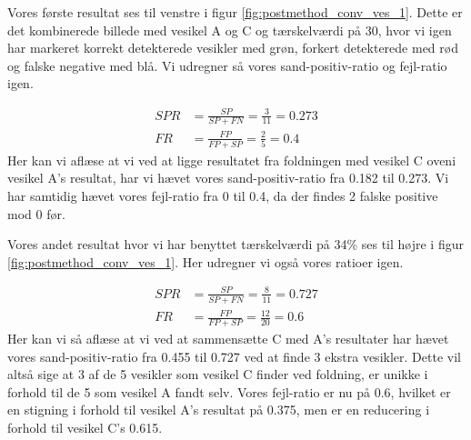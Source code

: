 Vores første resultat ses til venstre i figur \ref{fig:postmethod_conv_ves_1}. Dette er det kombinerede billede med vesikel A og C og tærskelværdi på 30, hvor vi igen har markeret korrekt detekterede vesikler med grøn, forkert detekterede med rød og falske negative med blå. Vi udregner så vores sand-positiv-ratio og fejl-ratio igen.

\begin{align}
	SPR &= \frac{SP}{SP+FN} = \frac{3}{11} = 0.273\\
	FR &= \frac{FP}{FP+SP} = \frac{2}{5} = 0.4
\end{align}
Her kan vi aflæse at vi ved at ligge resultatet fra foldningen med vesikel C oveni vesikel A's resultat, har vi hævet vores sand-positiv-ratio fra 0.182 til 0.273. Vi har samtidig hævet vores fejl-ratio fra 0 til 0.4, da der findes 2 falske positive mod 0 før.  

Vores andet resultat hvor vi har benyttet tærskelværdi på 34\% ses til højre i figur \ref{fig:postmethod_conv_ves_1}. Her udregner vi også vores ratioer igen.

\begin{align}
	SPR &= \frac{SP}{SP+FN} = \frac{8}{11} = 0.727\\
	FR &= \frac{FP}{FP+SP} = \frac{12}{20} = 0.6
\end{align}
Her kan vi så aflæse at vi ved at sammensætte C med A's resultater har hævet vores sand-positiv-ratio fra 0.455 til 0.727 ved at finde 3 ekstra vesikler. Dette vil altså sige at 3 af de 5 vesikler som vesikel C finder ved foldning, er unikke i forhold til de 5 som vesikel A fandt selv. Vores fejl-ratio er nu på 0.6, hvilket er en stigning i forhold til vesikel A's resultat på 0.375, men er en reducering i forhold til vesikel C's 0.615. 

